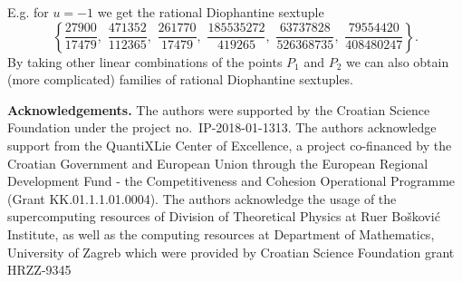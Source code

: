 \documentclass[a4paper]{amsart}
\theoremstyle{plain}
\theoremstyle{definition}
\begin{document}
E.g. for $u=-1$ we get the rational Diophantine sextuple
$$ \left\{\frac{27900}{17479}, \,\, \frac{471352}{112365}, \,\, \frac{261770}{17479}, \,\, 
\frac{185535272}{419265}, \,\, \frac{63737828}{526368735}, \,\, \frac{79554420}{408480247} \right\}. $$
By taking other linear combinations of the points $P_1$ and $P_2$ we can also obtain
(more complicated) families of rational Diophantine sextuples.

\bigskip

{\bf Acknowledgements.}
The authors were supported by the Croatian Science Foundation under the project no.~IP-2018-01-1313.
The authors acknowledge support from the QuantiXLie Center of Excellence, a project
co-financed by the Croatian Government and European Union through the
European Regional Development Fund - the Competitiveness and Cohesion
Operational Programme (Grant KK.01.1.1.01.0004).
The authors acknowledge the usage of the supercomputing resources
of Division of Theoretical Physics at Ru\dj{}er Bo\v{s}kovi\'c Institute,
as well as the computing resources at Department of Mathematics, University of Zagreb
which were provided by Croatian Science Foundation grant HRZZ-9345
\end{document}
